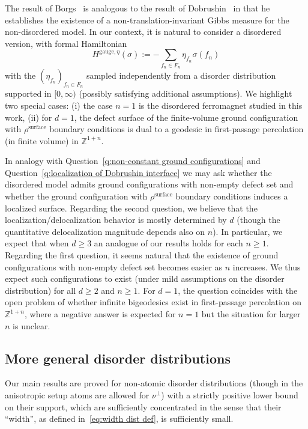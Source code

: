 \documentclass[11pt, reqno]{amsart}
\newcommand{\Z}{\mathbb{Z}}
\numberwithin{equation}{section}
\begin{document}
The result of Borgs~\cite{B84} is analogous to the result of Dobrushin~\cite{Dob} in that he establishes the existence of a non-translation-invariant Gibbs measure for the non-disordered model. In our context, it is natural to consider a disordered version, with formal Hamiltonian
\begin{equation}
H^{\text{gauge}, \eta}(\sigma) := -\sum_{f_n\in F_n}\eta_{f_n}\sigma(f_n)
\end{equation}
with the $(\eta_{f_n})_{f_n\in F_n}$ sampled independently from a disorder distribution supported in $[0,\infty)$ (possibly satisfying additional assumptions). We highlight two special cases: (i) the case $n=1$ is the disordered ferromagnet studied in this work, (ii) for $d=1$, the defect surface of the finite-volume ground configuration with $\rho^{\text{surface}}$ boundary conditions is dual to a geodesic in first-passage percolation (in finite volume) in $\Z^{1+n}$.

In analogy with Question~\ref{q:non-constant ground configurations} and Question~\ref{q:localization of Dobrushin interface} we may ask whether the disordered model admits ground configurations with non-empty defect set and whether the ground configuration with $\rho^{\text{surface}}$ boundary conditions induces a localized surface. Regarding the second question, we believe that the localization/delocalization behavior is mostly determined by $d$ (though the quantitative delocalization magnitude depends also on $n$). In particular, we expect that when $d\ge 3$ an analogue of our results holds for each $n\ge 1$. 
Regarding the first question, it seems natural that the existence of ground configurations with non-empty defect set becomes easier as $n$ increases. We thus expect such configurations to exist (under mild assumptions on the disorder distribution) for all $d\ge 2$ and $n\ge 1$. For $d=1$, the question coincides with the open problem of whether infinite bigeodesics exist in first-passage percolation on $\Z^{1+n}$, where a negative answer is expected for $n=1$ but the situation for larger $n$ is unclear.

\subsection{More general disorder distributions} 

Our main results are proved for non-atomic disorder distributions (though in the anisotropic setup atoms are allowed for $\nu^\perp$)
with a strictly positive lower bound on their support, which are sufficiently concentrated in the sense that their ``width'', as defined in~\eqref{eq:width dist def}, is sufficiently small. 
\end{document}
